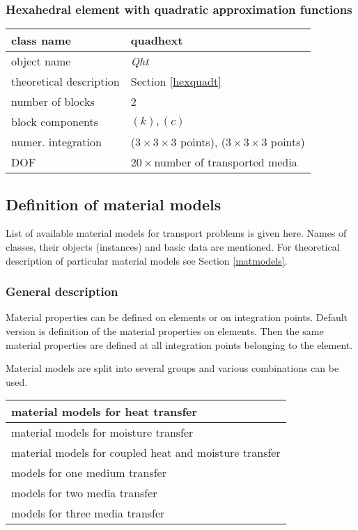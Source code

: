 \subsubsection{Hexahedral element with quadratic approximation functions}

\begin{center}
\begin{tabular}{|l|l|}
\hline
class name & {\sf quadhext}
\\ \hline
object name & {\it Qht}
\\ \hline
theoretical description & Section \ref{hexquadt}
\\ \hline
number of blocks & 2
\\ \hline
block components & $(k), (c)$
\\ \hline
numer. integration & ($3 \times 3 \times 3$ points), ($3 \times 3 \times 3$ points)
\\ \hline
DOF & $20 \times$number of transported media
\\ \hline
\end{tabular}
\end{center}


\subsection{Definition of material models}

List of available material models for transport problems is given here. Names of classes, their objects
(instances) and basic data are mentioned. For theoretical description of particular material models
see Section \ref{matmodels}.

\subsubsection{General description}

Material properties can be defined on elements or on integration points. Default
version is definition of the material properties on elements. Then the same material
properties are defined at all integration points belonging to the element.

Material models are split into several groups and various combinations can be used.

\begin{center}
\begin{tabular}{|l|}
\hline
material models for heat transfer
\\ \hline
material models for moisture transfer
\\ \hline
material models for coupled heat and moisture transfer
\\ \hline \hline
models for one medium transfer
\\ \hline
models for two media transfer
\\ \hline
models for three media transfer
\\ \hline
\end{tabular}
\end{center}


